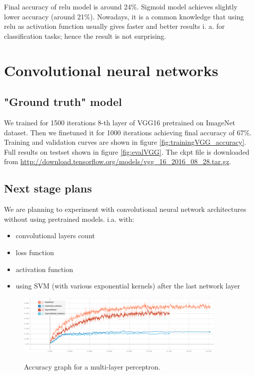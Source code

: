 \documentclass[a4paper]{article}
\begin{document}
\begin{multicols}{2}
Final accuracy of relu model is around 24\%.
Sigmoid model achieves slightly lower accuracy (around 21\%).
Nowadays, it is a common knowledge that using relu as activation function
usually gives faster and better results i. a. for classification tasks;
hence the result is not surprising.





\section{Convolutional neural networks}

\subsection{"Ground truth" model}

We trained for 1500 iterations 8-th layer of VGG16\cite{VGG16}
pretrained on ImageNet\cite{ImageNet} dataset.
Then we finetuned it for 1000 iterations achieving final accuracy of 67\%.
Training and validation curves are shown in figure \ref{fig:trainingVGG_accuracy}. %
Full results on testset shown in figure \ref{fig:evalVGG}.
The ckpt file is downloaded from \url{http://download.tensorflow.org/models/vgg_16_2016_08_28.tar.gz}.

\subsection{Next stage plans}

We are planning to experiment with convolutional neural network architectures
without using pretrained models.
i.a. with:
\begin{itemize}
    \item convolutional layers count
    \item loss function
    \item activation function
    \item using SVM (with various exponential kernels) after the last network layer

\end{itemize}




\end{multicols}

\begin{figure}[h]
    \caption[]{Accuracy graph for a multi-layer perceptron.}
    \centering
    \includegraphics[page=2,width=0.9\textwidth]{training_accuracy.png}
    \label{fig:training_accuracy}
\end{figure}
\end{document}

